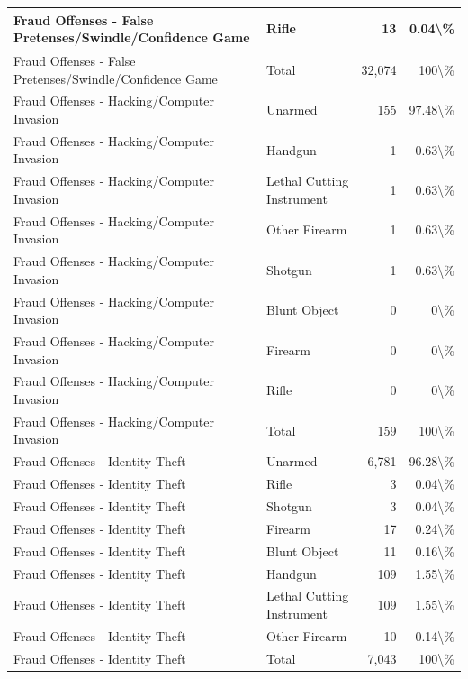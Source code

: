 \documentclass[
]{krantz}
\begin{document}
\begin{longtable}[t]{l|l|r|r}
Fraud Offenses - False Pretenses/Swindle/Confidence Game & Rifle & 13 & 0.04\textbackslash{}\%\\
\hline
Fraud Offenses - False Pretenses/Swindle/Confidence Game & Total & 32,074 & 100\textbackslash{}\%\\
\hline
Fraud Offenses - Hacking/Computer Invasion & Unarmed & 155 & 97.48\textbackslash{}\%\\
\hline
Fraud Offenses - Hacking/Computer Invasion & Handgun & 1 & 0.63\textbackslash{}\%\\
\hline
Fraud Offenses - Hacking/Computer Invasion & Lethal Cutting Instrument & 1 & 0.63\textbackslash{}\%\\
\hline
Fraud Offenses - Hacking/Computer Invasion & Other Firearm & 1 & 0.63\textbackslash{}\%\\
\hline
Fraud Offenses - Hacking/Computer Invasion & Shotgun & 1 & 0.63\textbackslash{}\%\\
\hline
Fraud Offenses - Hacking/Computer Invasion & Blunt Object & 0 & 0\textbackslash{}\%\\
\hline
Fraud Offenses - Hacking/Computer Invasion & Firearm & 0 & 0\textbackslash{}\%\\
\hline
Fraud Offenses - Hacking/Computer Invasion & Rifle & 0 & 0\textbackslash{}\%\\
\hline
Fraud Offenses - Hacking/Computer Invasion & Total & 159 & 100\textbackslash{}\%\\
\hline
Fraud Offenses - Identity Theft & Unarmed & 6,781 & 96.28\textbackslash{}\%\\
\hline
Fraud Offenses - Identity Theft & Rifle & 3 & 0.04\textbackslash{}\%\\
\hline
Fraud Offenses - Identity Theft & Shotgun & 3 & 0.04\textbackslash{}\%\\
\hline
Fraud Offenses - Identity Theft & Firearm & 17 & 0.24\textbackslash{}\%\\
\hline
Fraud Offenses - Identity Theft & Blunt Object & 11 & 0.16\textbackslash{}\%\\
\hline
Fraud Offenses - Identity Theft & Handgun & 109 & 1.55\textbackslash{}\%\\
\hline
Fraud Offenses - Identity Theft & Lethal Cutting Instrument & 109 & 1.55\textbackslash{}\%\\
\hline
Fraud Offenses - Identity Theft & Other Firearm & 10 & 0.14\textbackslash{}\%\\
\hline
Fraud Offenses - Identity Theft & Total & 7,043 & 100\textbackslash{}\%\\

\end{longtable}
\end{document}
